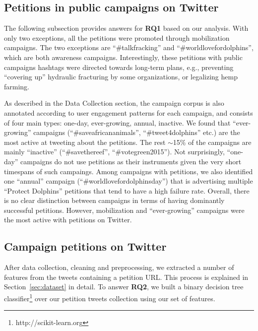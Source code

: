 \subsection{Petitions in public campaigns on Twitter}

The following subsection provides answers for \textbf{RQ1} based on our analysis.
With only two exceptions, all the petitions were promoted through mobilization campaigns. The two exceptions are ``\#talkfracking'' and ``\#worldlovefordolphins'', which are both awareness campaigns.
Interestingly, these petitions with public campaigns hashtags were directed towards long-term plans, e.g., preventing ``covering up'' hydraulic fracturing by some organizations, or legalizing hemp farming.

As described in the Data Collection section, the campaign corpus is also annotated according to user engagement patterns for each campaign, and consists of four main types: one-day, ever-growing, annual, inactive.
We found that ``ever-growing'' campaigns (``\#saveafricananimals'', ``\#tweet4dolphins'' etc.) are the most active at tweeting about the petitions.
The rest $\sim$15\% of the campaigns are mainly ``inactive'' (``\#savethereef'', ``\#votegreen2015'').
Not surprisingly, ``one-day'' campaigns do not use petitions as their instruments given the very short timespans of such campaings.
Among campaigns with petitions, we also identified one ``annual'' campaign (``\#worldlovefordolphinsday'') that is advertising multiple ``Protect Dolphins'' petitions that tend to have a high failure rate.
Overall, there is no clear distinction between campaigns in terms of having dominantly successful petitions.
However, mobilization and ``ever-growing'' campaigns were the most active with petitions on Twitter.

\subsection{Campaign petitions on Twitter}
After data collection, cleaning and preprocessing, we extracted a number of features from the tweets containing a petition URL.
This process is explained in Section~\ref{sec:dataset} in detail.
To answer \textbf{RQ2}, we built a binary decision tree classifier\footnote{ http://scikit-learn.org } over our petition tweets collection using our set of features.

